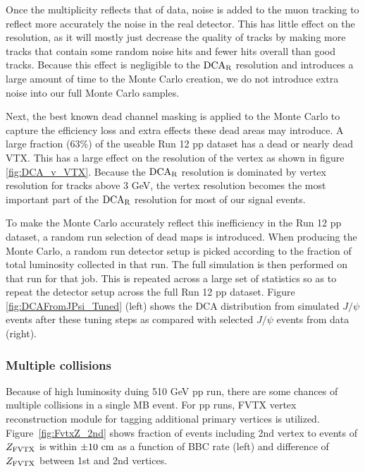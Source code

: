 \documentclass[12pt]{article}
\newcommand{\jpsi}{$J/\psi$ }
\newcommand{\dcar}{$\rm{DCA}_{R}$ }
\newcommand{\fvtxz}{$Z_{\rm FVTX}$ }
\begin{document}


Once the multiplicity reflects that of data, noise is added to the muon tracking to reflect more accurately the noise in the real detector. 
This has little effect on the resolution, as it will mostly just decrease the quality of tracks by making more tracks that contain
some random noise hits and fewer hits overall than good tracks.  Because this effect is negligible to the \dcar resolution and introduces
a large amount of time to the Monte Carlo creation, we do not introduce extra noise into our full Monte Carlo samples.  

Next, the best known dead channel masking is applied to the Monte Carlo to capture the efficiency loss and extra effects these dead areas may introduce.
A large fraction (63\%) of the useable Run 12 pp dataset has a dead or nearly dead VTX.  This has a large effect on the resolution
of the vertex as shown in figure \ref{fig:DCA_v_VTX}.  Because the \dcar resolution is dominated by vertex resolution for tracks above 3 GeV,
the vertex resolution becomes the most important part of the \dcar resolution for most of our signal events.  

To make the Monte Carlo  accurately reflect this inefficiency in the Run 12 pp dataset, a random run selection of dead maps is introduced.  
When producing the Monte Carlo, a random run detector setup is picked according to the fraction of total luminosity collected in that run.  
The full simulation is then performed on that run for that job.  This is repeated across a large set of statistics so as to repeat the detector 
setup across the full Run 12 pp dataset. Figure \ref{fig:DCAFromJPsi_Tuned} (left) shows the DCA distribution from simulated \jpsi events 
after these tuning steps as compared with selected \jpsi events from data (right). 
\subsubsection{Multiple collisions}
Because of high luminosity duing 510 GeV pp run, there are some chances of multiple collisions in a single MB event. 
For pp runs, FVTX vertex reconstruction module for tagging additional primary vertices is utilized.
Figure~\ref{fig:FvtxZ_2nd} shows fraction of events including 2nd vertex to events of \fvtxz is within $\pm10~{\rm cm}$ as a function of BBC rate (left) and difference of \fvtxz between 1st and 2nd vertices. 
\end{document}
